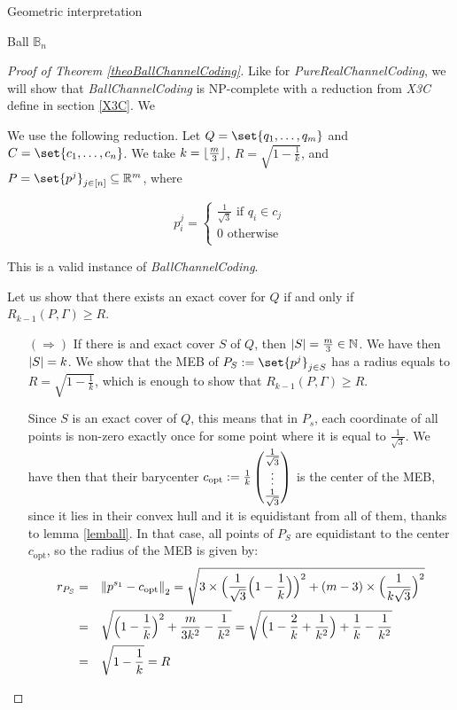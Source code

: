 \documentclass{article}
\theoremstyle{definition}
\theoremstyle{remark}
\DeclarePairedDelimiter\floor{\lfloor}{\rfloor}
\begin{document}
\begin{subsection}{Geometric interpretation}
\begin{subsubsection}{Ball $\mathbb{B}_n$}
  
  \begin{proof}[Proof of Theorem \ref{theoBallChannelCoding}]
    Like for \emph{PureRealChannelCoding}, we will show that \emph{BallChannelCoding} is NP-complete with a reduction from \emph{X3C} define in section \ref{X3C}. We 

    We use the following reduction. Let $Q = \set{q_1,\ldots,q_m}$ and $C = \set{c_1,\ldots,c_n}$.
    We take $k=\floor{\frac{m}{3}}$, $R=\sqrt{1 - \frac{1}{k}}$, and $P =\set{p^j}_{j \in [n]} \subseteq \mathbb{R}^m$, where

    \[p^j_i = \begin{cases}
      \frac{1}{\sqrt{3}} \text{ if } q_i \in c_j\\
      0 \text{ otherwise}\\
    \end{cases}
    \]

    This is a valid instance of \emph{BallChannelCoding}.

    Let us show that there exists an exact cover for $Q$ if and only if $R_{k-1}(P,\Gamma) \geq R$.

    \begin{itemize}
    \item[$(\Rightarrow)$] If there is and exact cover $S$ of $Q$, then $\abs{S} = \frac{m}{3} \in \mathbb{N}$. We have then $\abs{S} = k$. We show that the MEB of $P_S := \set{p^j}_{j \in S}$ has a radius equals to $R=\sqrt{1 - \frac{1}{k}}$, which is enough to show that $R_{k-1}(P,\Gamma) \geq R$.

      Since $S$ is an exact cover of $Q$, this means that in $P_s$, each coordinate of all points is non-zero exactly once for some point where it is equal to $\frac{1}{\sqrt{3}}$. We have then that their barycenter $c_{\text{opt}} := \frac{1}{k}\pmqty{\frac{1}{\sqrt{3}}\\\vdots\\\frac{1}{\sqrt{3}}}$ is the center of the MEB, since it lies in their convex hull and it is equidistant from all of them, thanks to lemma \ref{lemball}. In that case, all points of $P_S$ are equidistant to the center $c_{\text{opt}}$, so the radius of the MEB is given by:
      \begin{equation}
        \begin{aligned}
          r_{P_S} &=&& \norm{p^{s_1}-c_{\text{opt}}}_2 = \sqrt{3\times\Big(\frac{1}{\sqrt{3}}\Big(1-\frac{1}{k}\Big)\Big)^2 + (m-3)\times\Big(\frac{1}{k\sqrt{3}}\Big)^2} \\
          &=&&\sqrt{\Big(1-\frac{1}{k}\Big)^2 + \frac{m}{3k^2} - \frac{1}{k^2}} = \sqrt{\Big(1 - \frac{2}{k} + \frac{1}{k^2}\Big) + \frac{1}{k} - \frac{1}{k^2}} \\
          &=&& \sqrt{1 - \frac{1}{k}} = R
        \end{aligned}
      \end{equation}
      

\end{itemize}
\end{proof}
\end{subsubsection}
\end{subsection}
\end{document}
